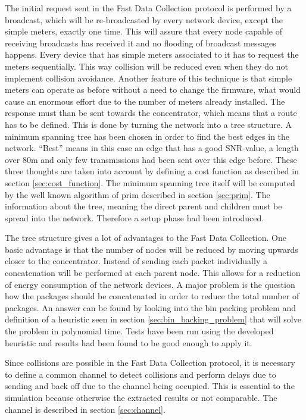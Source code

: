 The initial request sent in the Fast Data Collection protocol is performed by a broadcast, which will be re-broadcasted by every network device, except the simple meters, exactly one time. This will assure that every node capable of receiving broadcasts has received it and no flooding of broadcast messages happens. Every device that has simple meters associated to it has to request the meters sequentially. This way collision will be reduced even when they do not implement collision avoidance. Another feature of this technique is that simple meters can operate as before without a need to change the firmware, what would cause an enormous effort due to the number of meters already installed. The response must than be sent towards the concentrator, which means that a route has to be defined. This is done by turning the network into a tree structure. A minimum spanning tree has been chosen in order to find the best edges in the network. ``Best'' means in this case an edge that has a good SNR-value, a length over 80m and only few transmissions had been sent over this edge before. These three thoughts are taken into account by defining a cost function as described in section \ref{sec:cost_function}. The minimum spanning tree itself will be computed by the well known algorithm of prim described in section \ref{sec:prim}. The information about the tree, meaning the direct parent and children must be spread into the network. Therefore a setup phase had been introduced.

The tree structure gives a lot of advantages to the Fast Data Collection. One basic advantage is that the number of nodes will be reduced by moving upwards closer to the concentrator. Instead of sending each packet individually a concatenation will be performed at each parent node. This allows for a reduction of energy consumption of the network devices. A major problem is the question how the packages should be concatenated in order to reduce the total number of packages. An answer can be found by looking into the bin packing problem and definition of a heuristic seen in section \ref{sec:bin_backing_problem} that will solve the problem in polynomial time. Tests have been run using the developed heuristic and results had been found to be good enough to apply it.

Since collisions are possible in the Fast Data Collection protocol, it is necessary to define a common channel to detect collisions and perform delays due to sending and back off due to the channel being occupied. This is essential to the simulation because otherwise the extracted results or not comparable. The channel is described in section \ref{sec:channel}.